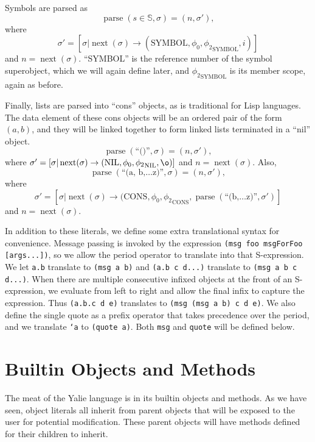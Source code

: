 \documentclass[twocolumn]{article}
\begin{document}
Symbols are parsed as
\[ \operatorname{parse}(s\in\mathbb{S},\sigma) = (n,\sigma'),\]
where \[\sigma' = [\sigma|\operatorname{next}(\sigma) \rightarrow
(\text{SYMBOL}, {\phi_0}, {\phi_2}_{\text{SYMBOL}}, i)]\] and
$n=\operatorname{next}(\sigma)$. ``SYMBOL'' is the reference number of
the symbol superobject, which we will again define later, and
${\phi_2}_{\text{SYMBOL}}$ is its member scope, again as before.

Finally, lists are parsed into ``cons'' objects, as is traditional for
Lisp languages. The data element of these cons objects will be an
ordered pair of the form $(a,b)$, and they will be linked together to
form linked lists terminated in a ``nil'' object.
\[ \operatorname{parse}(\text{``()''},\sigma) = (n,\sigma'),\]
where $\sigma' = [\sigma|\operatorname{next}(\sigma) \rightarrow
(\text{NIL}, \phi_0, {\phi_2}_{\text{NIL}},
\o)]$ and $n=\operatorname{next}(\sigma)$. Also,
\[ \operatorname{parse}(\text{``(a, b,\ldots z)''},\sigma) =
(n,\sigma'),\] where \[\sigma' = [\sigma|\operatorname{next}(\sigma)
\rightarrow (\text{CONS}, \phi_0, {\phi_2}_{\text{CONS}},
\operatorname{parse}(\text{``(b,\ldots z)''},\sigma')]\] and
$n=\operatorname{next}(\sigma)$.

In addition to these literals, we define some extra translational
syntax for convenience. Message passing is invoked by the expression
\texttt{(msg foo msgForFoo [args...])}, so we allow the period
operator to translate into that S-expression. We let \texttt{a.b}
translate to \texttt{(msg a b)} and \texttt{(a.b c d...)} translate to
\texttt{(msg a b c d...)}. When there are multiple consecutive
infixed objects at the front of an S-expression, we evaluate from left
to right and allow the final infix to capture the expression. Thus
\texttt{(a.b.c d e)} translates to \texttt{(msg (msg a b) c d e)}. We
also define the single quote as a prefix operator that takes
precedence over the period, and we translate \texttt{`a} to
\texttt{(quote a)}. Both \texttt{msg} and \texttt{quote} will be
defined below.

\section*{Builtin Objects and Methods}
The meat of the Yalie language is in its builtin objects and
methods. As we have seen, object literals all inherit from parent
objects that will be exposed to the user for potential
modification. These parent objects will have methods defined for their
children to inherit.
\end{document}
